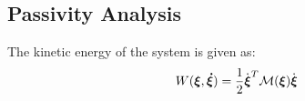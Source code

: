\subsection{Passivity Analysis}

The kinetic energy of the system is given as:
\begin{equation}
	W(\vecs \xi, \vecs{\dot \xi}) = \frac{1}{2}  \dot{\vecs{\xi}}^T \matd{M}(\vecs \xi) \dot{\vecs{\xi}} \label{eq:energy_system}
\end{equation}

  
